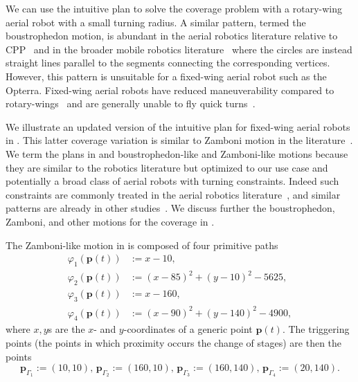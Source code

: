 We can use the intuitive plan to solve the coverage problem with a rotary-wing aerial robot with a small turning radius. A similar pattern, termed the boustrophedon motion, is abundant in the aerial robotics literature relative to CPP~\citep{difranco2015energy,araujo2013multiple,artemenko2016energy,cabreira2018energy} and in the broader mobile robotics literature~\citep{choset2005principles,lavalle2006planning,choset2001coverage} where the circles are instead straight lines parallel to the segments connecting the corresponding vertices. However, this pattern is unsuitable for a fixed-wing aerial robot such as the Opterra. Fixed-wing aerial robots have reduced maneuverability compared to rotary-wings~\citep{dille2013efficient,mannadiar2010optimal,xu2011optimal,xu2014efficient} and are generally unable to fly quick turns~\citep{wang2017curvature}.

We illustrate an updated version of the intuitive plan for fixed-wing aerial robots in . This latter coverage variation is similar to Zamboni motion in the literature~\citep{araujo2013multiple}. 
We term the plans in  and  boustrophedon-like and Zamboni-like motions because they are similar to the robotics literature but optimized to our use case and potentially a broad class of aerial robots with turning constraints. Indeed such constraints are commonly treated in the aerial robotics literature~\citep{artemenko2016energy,li2011coverage,xu2011optimal,xu2014efficient}, and similar patterns are already in other studies~\citep{huang2001optimal,xu2014efficient}. We discuss further the boustrophedon, Zamboni, and other motions for the coverage in . 

The Zamboni-like motion in  is composed of four primitive paths
\begin{subequations}\label{eq:basic-plan}\begin{align}
\varphi_1(\mathbf{p}(t))&:=x-10,\label{eq:line1}\\
\varphi_2(\mathbf{p}(t))&:=(x-85)^2+(y-10)^2-5625,\label{eq:circ1}\\
\varphi_3(\mathbf{p}(t))&:=x-160,\label{eq:line2}\\
\varphi_4(\mathbf{p}(t))&:=(x-90)^2+(y-140)^2-4900,\label{eq:circ2}\end{align}
\end{subequations}
where $x,y$s are the $x$- and $y$-coordinates of a generic point $\mathbf{p}(t)$. The triggering points (the points in which proximity occurs the change of stages) are then the points
\begin{equation}\label{eq:basic-plan-trigs}
  \mathbf{p}_{\Gamma_1}:=(10,10),\,\mathbf{p}_{\Gamma_2}:=(160,10),\,\mathbf{p}_{\Gamma_3}:=(160,140),\,\mathbf{p}_{\Gamma_4}:=(20,140).
\end{equation}

